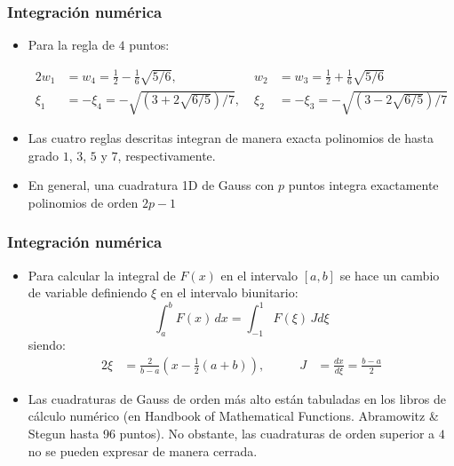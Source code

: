 \documentclass[handout]{beamer}
\begin{document}
\begin{frame}
	\frametitle{Integración numérica}
	\begin{itemize}
		\item Para la regla de $4$ puntos:
		\begin{small}
			\begin{alignat*}{2}
				w_1&=w_4=\frac{1}{2}-\frac{1}{6}\sqrt{5/6}, \; &
				w_2&=w_3=\frac{1}{2}+\frac{1}{6}\sqrt{5/6}  \\
				\xi_1&=-\xi_4=-\sqrt{(3+2\sqrt{6/5})/7}, \; &
				\xi_2&=-\xi_3=-\sqrt{(3-2\sqrt{6/5})/7}
			\end{alignat*}
		\end{small}
		\item Las cuatro reglas descritas integran de manera exacta polinomios de hasta
		grado $1$, $3$, $5$ y $7$, respectivamente.
		\item En general, una cuadratura 1D de Gauss con $p$ puntos integra
		exactamente polinomios de orden $2p-1$
	\end{itemize}
\end{frame}
\begin{frame}
	\frametitle{Integración numérica}
	\begin{itemize}
		\item Para calcular la integral de $F(x)$ en el intervalo $[a,b]$ se hace
		un cambio de variable definiendo $\xi$ en el intervalo biunitario:
		$$
		\int_a^b F(x) \, dx = \int_{-1}^1 F(\xi) \, J d\xi
		$$
		siendo:
		\begin{alignat*}{2}
			\xi&=\frac{2}{b-a} \left( x-\frac{1}{2} (a+b) \right), \qquad &
			J&=\frac{dx}{d\xi}=\frac{b-a}{2}
		\end{alignat*}
		\item Las cuadraturas de Gauss de orden más alto están tabuladas en los
		libros de cálculo numérico (en {\sc Handbook of Mathematical Functions.
			Abramowitz \& Stegun} hasta 96 puntos). No obstante, las cuadraturas de 
		orden superior a $4$ no se pueden expresar de manera cerrada.
	\end{itemize}
\end{frame}
\end{document}
